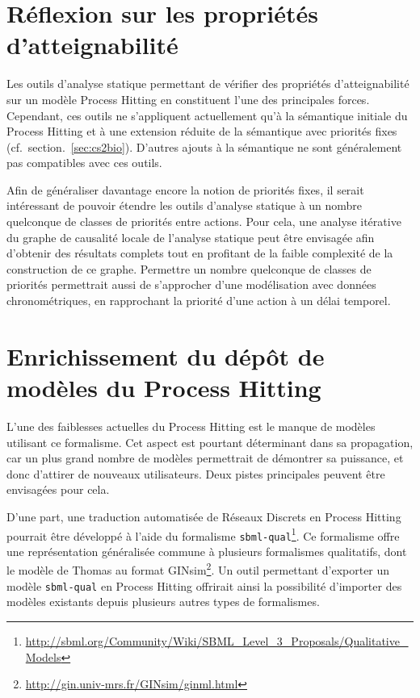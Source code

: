 \section{Réflexion sur les propriétés d'atteignabilité}

Les outils d'analyse statique permettant de vérifier des propriétés d'atteignabilité sur un modèle Process Hitting en constituent l'une des principales forces.
Cependant, ces outils ne s'appliquent actuellement qu'à la sémantique initiale du Process Hitting
et à une extension réduite de la sémantique avec priorités fixes (cf.~section.~\ref{sec:cs2bio}).
D'autres ajouts à la sémantique ne sont généralement pas compatibles avec ces outils.

Afin de généraliser davantage encore la notion de priorités fixes, il serait intéressant de pouvoir étendre les outils d'analyse statique à un nombre quelconque de classes de priorités entre actions.
Pour cela, une analyse itérative du graphe de causalité locale de l'analyse statique peut être envisagée afin d'obtenir des résultats complets tout en profitant de la faible complexité de la construction de ce graphe.
Permettre un nombre quelconque de classes de priorités permettrait aussi de s'approcher d'une modélisation avec données chronométriques,
en rapprochant la priorité d'une action à un délai temporel.



\section{Enrichissement du dépôt de modèles du Process Hitting}
L'une des faiblesses actuelles du Process Hitting est le manque de modèles utilisant ce formalisme.
Cet aspect est pourtant déterminant dans sa propagation, car un plus grand nombre de modèles permettrait de démontrer sa puissance, et donc d'attirer de nouveaux utilisateurs.
Deux pistes principales peuvent être envisagées pour cela.

D'une part, une traduction automatisée de Réseaux Discrets en Process Hitting pourrait être développé à l'aide du formalisme \texttt{sbml-qual}\footnote{\url{http://sbml.org/Community/Wiki/SBML_Level_3_Proposals/Qualitative_Models}}.
Ce formalisme offre une représentation généralisée commune à plusieurs formalismes qualitatifs, dont le modèle de Thomas au format GINsim\footnote{\url{http://gin.univ-mrs.fr/GINsim/ginml.html}}.
Un outil permettant d'exporter un modèle \texttt{sbml-qual} en Process Hitting offrirait ainsi la possibilité d'importer des modèles existants depuis plusieurs autres types de formalismes.


